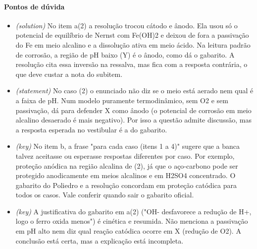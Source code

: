 \documentclass{article}%
\begin{document}
\paragraph{Pontos de dúvida}%
\begin{itemize}%
\item%
\textit{(solution)} No item a(2) a resolução trocou cátodo e ânodo. Ela usou só o potencial de equilíbrio de Nernst com Fe(OH)2 e deixou de fora a passivação do Fe em meio alcalino e a dissolução ativa em meio ácido. Na leitura padrão de corrosão, a região de pH baixo (Y) é o ânodo, como dá o gabarito. A resolução cita essa inversão na ressalva, mas fica com a resposta contrária, o que deve custar a nota do subitem.%
\item%
\textit{(statement)} No caso (2) o enunciado não diz se o meio está aerado nem qual é a faixa de pH. Num modelo puramente termodinâmico, sem O2 e sem passivação, dá para defender X como ânodo (o potencial de corrosão em meio alcalino desaerado é mais negativo). Por isso a questão admite discussão, mas a resposta esperada no vestibular é a do gabarito.%
\item%
\textit{(key)} No item b, a frase "para cada caso (itens 1 a 4)" sugere que a banca talvez aceitasse ou esperasse respostas diferentes por caso. Por exemplo, proteção anódica na região alcalina de (2), já que o aço{-}carbono pode ser protegido anodicamente em meios alcalinos e em H2SO4 concentrado. O gabarito do Poliedro e a resolução concordam em proteção catódica para todos os casos. Vale conferir quando sair o gabarito oficial.%
\item%
\textit{(key)} A justificativa do gabarito em a(2) ("OH- desfavorece a redução de H+, logo o ferro oxida menos") é cinética e resumida. Não menciona a passivação em pH alto nem diz qual reação catódica ocorre em X (redução de O2). A conclusão está certa, mas a explicação está incompleta.%
\end{itemize}%
\end{document}
